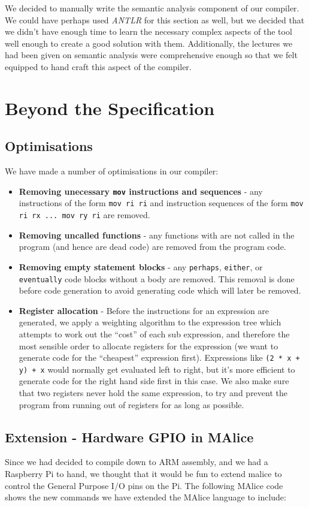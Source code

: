 \documentclass[11pt, notitlepage]{report}
\begin{document}
We decided to manually write the semantic analysis component of our compiler. We could have perhaps used \emph{ANTLR} for this section as well, but we decided that we didn't have enough time to learn the necessary complex aspects of the tool well enough to create a good solution with them. Additionally, the lectures we had been given on semantic analysis were comprehensive enough so that we felt equipped to hand craft this aspect of the compiler.

\section*{Beyond the Specification}
\subsection*{Optimisations}
We have made a number of optimisations in our compiler:
\begin{itemize}
\item \textbf{Removing unecessary \texttt{mov} instructions and sequences} - any instructions of the form \texttt{mov ri ri} and instruction sequences of the form \texttt{mov ri rx ... mov ry ri} are removed.
\item \textbf{Removing uncalled functions} - any functions with are not called in the program (and hence are dead code) are removed from the program code.
\item \textbf{Removing empty statement blocks} - any \texttt{perhaps}, \texttt{either}, or \texttt{eventually} code blocks without a body are removed. This removal is done before code generation to avoid generating code which will later be removed.
\item \textbf{Register allocation} - Before the instructions for an expression are generated, we apply a weighting algorithm to the expression tree which attempts to work out the ``cost'' of each sub expression, and therefore the most sensible order to allocate registers for the expression (we want to generate code for the ``cheapest'' expression first). Expressions like \texttt{(2 * x + y) + x} would normally get evaluated left to right, but it's more efficient to generate code for the right hand side first in this case. We also make sure that two registers never hold the same expression, to try and prevent the program from running out of registers for as long as possible.
\end{itemize}

\subsection*{Extension - Hardware GPIO in MAlice}
Since we had decided to compile down to ARM assembly, and we had a Raspberry Pi to hand, we thought that it would be fun to extend malice to control the General Purpose I/O pins on the Pi. The following MAlice code shows the new commands we have extended the MAlice language to include:
\end{document}
